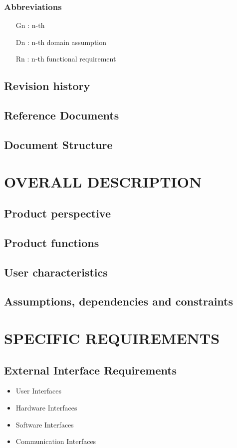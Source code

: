 \documentclass{article}
\begin{document}
\subsubsection{Abbreviations}
\begin{itemize}
\item [Gn]: n-th 
\item [Dn]: n-th domain assumption
\item [Rn]: n-th functional requirement
\end{itemize}

\subsection{Revision history}
\subsection{Reference Documents}
\subsection{Document Structure}

\section{OVERALL DESCRIPTION}

\subsection{Product perspective}

\subsection{Product functions}
\subsection{User characteristics}
\subsection{Assumptions, dependencies and constraints}

\section{SPECIFIC REQUIREMENTS}
\subsection{External Interface Requirements}
		\begin{itemize}
			\item User Interfaces
			\item Hardware Interfaces
			\item Software Interfaces
			\item Communication Interfaces
		\end{itemize}
\end{document}
